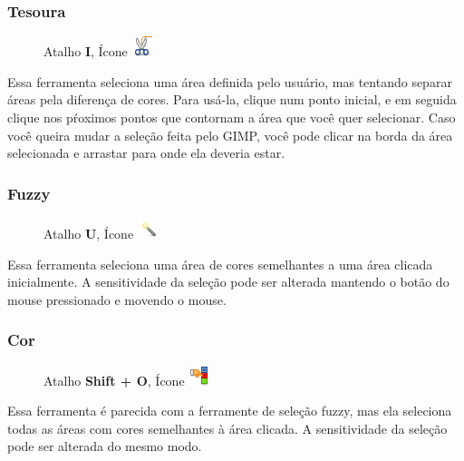 \documentclass[12pt,onecolumn]{article}
\begin{document}
      \subsubsection{Tesoura}
      \begin{figure}[H]
        Atalho {\bf I}, Ícone
        \includegraphics{gimp-icons/stock-tool-iscissors-22.png}
        \label{fig:scissorsselect}
      \end{figure}
      Essa ferramenta seleciona uma área definida pelo usuário, mas tentando separar áreas pela
      diferença de cores. Para usá-la, clique num ponto inicial, e em seguida clique nos pŕoximos
      pontos que contornam a área que você quer selecionar. Caso você queira mudar a seleção feita
      pelo GIMP, você pode clicar na borda da área selecionada e arrastar para onde ela deveria 
      estar.

      \subsubsection{Fuzzy}
      \begin{figure}[H]
        Atalho {\bf U}, Ícone
        \includegraphics{gimp-icons/stock-tool-fuzzy-select-22.png}
        \label{fig:magicselect}
      \end{figure}
      Essa ferramenta seleciona uma área de cores semelhantes a uma área clicada inicialmente.
      A sensitividade da seleção pode ser alterada mantendo o botão do mouse pressionado e movendo
      o mouse.

      \subsubsection{Cor}
      \begin{figure}[H]
        Atalho {\bf Shift + O}, Ícone
        \includegraphics{gimp-icons/stock-tool-by-color-select-22.png}
        \label{fig:colorselect}
      \end{figure}
      Essa ferramenta é parecida com a ferramente de seleção fuzzy, mas ela seleciona todas as áreas
      com cores semelhantes à área clicada. A sensitividade da seleção pode ser alterada do mesmo
      modo.
\end{document}
